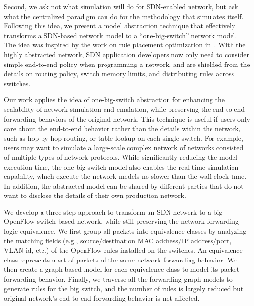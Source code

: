 \label{OBS:Sec:Intro}

Second, we ask not what simulation will do for SDN-enabled network, but ask what the centralized paradigm can do for the methodology that simulates itself.
Following this idea, we present a model abstraction technique that effectively transforms
a SDN-based network model to a ``one-big-switch'' network model.
The idea was inspired by the work on rule placement optimization in~\cite{OneBigSwitchAbstraction}.
With the highly abstracted network, SDN application developers now only need to consider
simple end-to-end policy when programming a network,
and are shielded from the details on routing policy, switch memory limits,
and distributing rules across switches.

Our work applies the idea of one-big-switch abstraction for enhancing the scalability
of network simulation and emulation, while preserving the end-to-end forwarding behaviors of the original network.
This technique is useful if users only care about the end-to-end behavior rather than
the details within the network, such as hop-by-hop routing, or table lookup on each single switch.
For example, users may want to simulate a large-scale complex network of networks consisted of multiple types of network protocols.
While significantly reducing the model execution time, the one-big-switch model also enables the real-time simulation capability,
which execute the network models no slower than the wall-clock time.
In addition, the abstracted model can be shared by different parties that do not want to disclose the details
of their own production network.

We develop a three-step approach to transform an SDN network to a big OpenFlow switch based network,
while still preserving the network forwarding logic equivalence.
We first group all packets into equivalence classes by analyzing the matching fields
(e.g., source/destination MAC address/IP address/port, VLAN id, etc.)
of the OpenFlow rules installed on the switches.
An equivalence class represents a set of packets of the same network forwarding behavior.
We then create a graph-based model for each equivalence class to model its packet forwarding behavior.
Finally, we traverse all the forwarding graph models to generate rules for the big switch,
and the number of rules is largely reduced but original network's end-to-end forwarding behavior is not affected.

